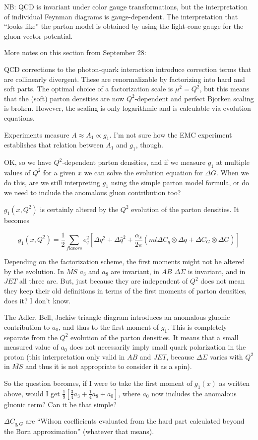 NB: QCD is invariant under color gauge transformations, but the interpretation of individual Feynman diagrams is gauge-dependent.  The interpretation that ``looks like'' the parton model is obtained by using the light-cone gauge for the gluon vector potential.

More notes on this section from September 28:

QCD corrections to the photon-quark interaction introduce correction terms
that are collinearly divergent. These are renormalizable by factorizing into
hard and soft parts. The optimal choice of a factorization scale is $\mu^2 =
Q^2$, but this means that the (soft) parton densities are now $Q^2$-dependent
and perfect Bjorken scaling is broken. However, the scaling is only
logarithmic and is calculable via evolution equations.

Experiments measure $A \approx A_1 \propto g_1$.  I'm not sure how the EMC experiment establishes that relation between $A_1$ and $g_1$, though.

OK, so we have $Q^2$-dependent parton densities, and if we measure $g_1$ at
multiple values of $Q^2$ for a given $x$ we can solve the evolution equation
for $\Delta G$. When we do this, are we still interpreting $g_1$ using the
simple parton model formula, or do we need to include the anomalous gluon
contribution too?

$g_1(x, Q^2)$ is certainly altered by the $Q^2$ evolution of the parton densities.  It becomes

\begin{equation}
  g_1(x, Q^2) = \frac{1}{2} \sum_{flavors} e_q^2 \left[\Delta q^2 + \Delta \bar{q}^2 + \frac{\alpha_s}{2 \pi} \left(ml\Delta C_q \otimes \Delta q + \Delta C_G \otimes \Delta G\right)\right]
\end{equation}

Depending on the factorization scheme, the first moments might not be altered
by the evolution. In $\bar{MS}$ $a_3$ and $a_8$ are invariant, in $AB$ $\Delta
\Sigma$ is invariant, and in $JET$ all three are. But, just because they are
independent of $Q^2$ does not mean they keep their old definitions in terms of
the first moments of parton densities, does it? I don't know.

The Adler, Bell, Jackiw triangle diagram introduces an anomalous gluonic
contribution to $a_0$, and thus to the first moment of $g_1$. This is
completely separate from the $Q^2$ evolution of the parton densities. It means
that a small measured value of $a_0$ does not necessarily imply small quark
polarization in the proton (this interpretation only valid in $AB$ and $JET$,
because $\Delta \Sigma$ varies with $Q^2$ in $\bar{MS}$ and thus it is not
appropriate to consider it as a spin).

So the question becomes, if I were to take the first moment of $g_1(x)$ as
written above, would I get $\frac{1}{9}\left[\frac{3}{4}a_3+\frac{1}{4}a_8 +
a_0\right]$, where $a_0$ now includes the anomalous gluonic term? Can it be
that simple?

$\Delta C_{q,G}$ are ``Wilson coefficients evaluated from the hard part calculated beyond the Born approximation'' (whatever that means).
